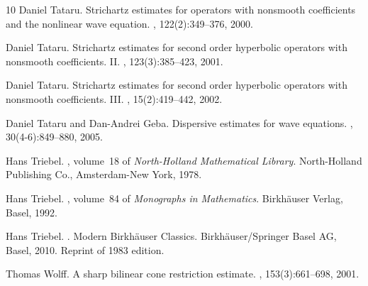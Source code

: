 \documentclass{amsart}
\numberwithin{equation}{section}
\theoremstyle{definition}
\begin{document}
\begin{thebibliography}{10}
Daniel Tataru.
\newblock Strichartz estimates for operators with nonsmooth coefficients and
  the nonlinear wave equation.
, 122(2):349--376, 2000.

Daniel Tataru.
\newblock Strichartz estimates for second order hyperbolic operators with
  nonsmooth coefficients. {II}.
, 123(3):385--423, 2001.

Daniel Tataru.
\newblock Strichartz estimates for second order hyperbolic operators with
  nonsmooth coefficients. {III}.
, 15(2):419--442, 2002.

Daniel Tataru and Dan-Andrei Geba.
\newblock Dispersive estimates for wave equations.
, 30(4-6):849--880, 2005.

Hans Triebel.
, volume~18 of {\em North-Holland Mathematical Library}.
\newblock North-Holland Publishing Co., Amsterdam-New York, 1978.

Hans Triebel.
, volume~84 of {\em
  Monographs in Mathematics}.
\newblock Birkh\"{a}user Verlag, Basel, 1992.

Hans Triebel.
.
\newblock Modern Birkh\"auser Classics. Birkh\"auser/Springer Basel AG, Basel,
  2010.
\newblock Reprint of 1983 edition.

Thomas Wolff.
\newblock A sharp bilinear cone restriction estimate.
, 153(3):661--698, 2001.

\end{thebibliography}
\end{document}
